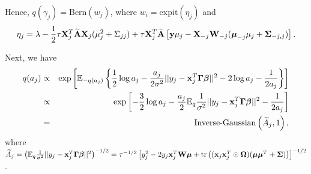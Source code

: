 \documentclass[11pt]{article}
\newtheorem{Main Result}{Main Result}
\def\vectorfontone{\bf}
\def\vectorfonttwo{\boldsymbol}
\def\vx{{\vectorfontone x}}                      %
\def\vy{{\vectorfontone y}}                      %
\def\vbeta{{\vectorfonttwo \beta}}               %
\def\vmu{{\vectorfonttwo \mu}}                   %
\def\matrixfontone{\bf}
\def\matrixfonttwo{\boldsymbol}
\def\mA{{\matrixfontone A}}                      %
\def\mW{{\matrixfontone W}}                      %
\def\mX{{\matrixfontone X}}                      %
\def\mGamma{{\matrixfonttwo \Gamma}}             %
\def\mSigma{{\matrixfonttwo \Sigma}}             %
\def\mOmega{{\matrixfonttwo \Omega}}             %
\def\bE{{\mathbb E}}                             %
\def\ds{\displaystyle}
\def\tr{\text{tr}}
\newcommand{\cyc}[1]{{\color{black}#1}}
\begin{document}
{\noindent Hence, $q(\gamma_j)=\mbox{Bern}(w_j)$, where $w_i=\mbox{expit}(\eta_j)$ and $$
\eta_j=\lambda -\frac{1}{2}\tau\mX_j^T\widetilde{\mA}\mX_j(\mu_j^2+\Sigma_{jj})
+
\tau\mX^T_j\widetilde{\mA}\left[\vy\mu_j-\mX_{-j}\mW_{-j}(\vmu_{-j}\mu_j + \mSigma_{-j,j})\right].
$$

\noindent Next, we have
\begin{eqnarray*}
	q(a_j)
	&\propto&\exp\left[\bE_{-q({a_j})}\left\{
	\frac{1}{2}\log a_j - \frac{a_j}{2\sigma^2}||y_j-\vx_j^T\mGamma\vbeta||^2
	-2\log a_j - \frac{1}{2a_j}\right\}\right]\\
	&\propto&\exp\left[
	-\frac{3}{2}\log a_j - \frac{a_j}{2}\bE_q\frac{1}{\sigma^2}||y_j-\vx_j^T\mGamma\vbeta||^2
	- \frac{1}{2a_j}\right]\\
	&= &\mbox{Inverse-Gaussian}\left(\widetilde{A}_j,1\right),
\end{eqnarray*}
where $\widetilde{A}_j=\left(\bE_q\frac{1}{\sigma^2}||y_j-\vx_j^T\mGamma\vbeta||^2\right)^{-1/2}=\tau^{-1/2}\left[y_j^2-2y_j\vx^T_j\mW\vmu+\tr\left( (\vx_j\vx_j^T\odot\mOmega)(\vmu\vmu^{T} + \mSigma) \right)\right]^{-1/2}$.

}
\end{document}

